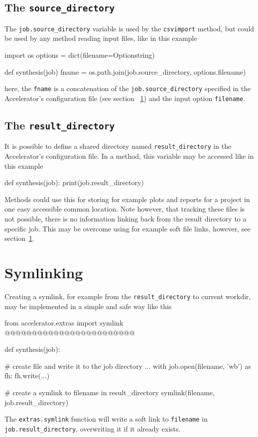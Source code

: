 \subsection{The \texttt{source\_directory}}
\label{sec:SOURCE_DIR}
The \texttt{job.source\_directory} variable is used by the
\texttt{csvimport} method, but could be used by any method reading
input files, like in this example
\begin{python}
import os
options = dict(filename=Optionstring)

def synthesis(job)
    fname = os.path.join(job.source_directory, options.filename)
\end{python}
here, the \texttt{fname} is a concatenation of the
\texttt{job.source\_directory} specified in the Accelerator's
configuration file (see section ~\ref{sec:symlinking}) and the input
option \texttt{filename}.


\subsection{The \texttt{result\_directory}}
\label{sec:RESULT_DIR}
It is possible to define a shared directory
named \texttt{result\_directory} in the Accelerator's configuration
file.  In a method, this variable may be accessed like in this example
\begin{python}
def synthesis(job):
    print(job.result_directory)
\end{python}
Methods could use this for storing for example plots and reports for a
project in one easy accessible common location.  Note however, that
tracking these files is not possible, there is no information linking
back from the result directory to a specific job.  This may be
overcome using for example soft file links, however, see
section~\ref{sec:symlinking}.



\section{Symlinking}
\label{sec:symlinking}
Creating a symlink, for example from the \texttt{result\_directory} to
current workdir, may be implemented in a simple and safe way like this
\begin{python}
from accelerator.extras import symlink @@@@@@@@@@@@@@@@@@@@@@@@

def synthesis(job):

    # create file and write it to the job directory
    ...
    with job.open(filename, 'wb') as fh:
        fh.write(...)

    # create a symlink to filename in result_directory
    symlink(filename, job.result_directory)
\end{python}
The \texttt{extras.symlink} function will write a soft link
to \texttt{filename} in \texttt{job.result\_directory}, overwriting it if
it already exists.



